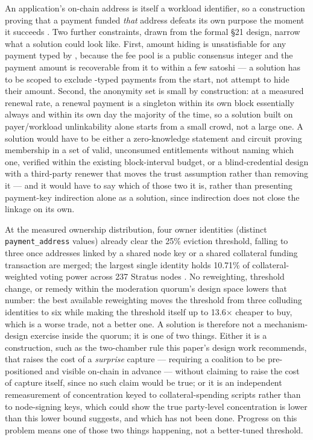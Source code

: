 \begin{openproblem}
An application's on-chain address is itself a workload identifier, so a construction proving that a
payment funded \emph{that} address defeats its own purpose the moment it succeeds
. Two further constraints, drawn from the formal §21 design,
narrow what a solution could look like. First, amount hiding is unsatisfiable for any payment typed
by \PNR, because the fee pool is a public consensus integer and the payment amount is recoverable
from it to within a few satoshi — a solution has to be scoped to exclude \PNR-typed payments from
the start, not attempt to hide their amount. Second, the anonymity set is small by construction: at a
measured renewal rate, a renewal payment is a singleton within its own block essentially always and
within its own day the majority of the time, so a solution built on payer/workload unlinkability alone
starts from a small crowd, not a large one. A solution would have to be either a zero-knowledge
statement and circuit proving membership in a set of valid, unconsumed entitlements without naming
which one, verified within the existing block-interval budget, or a blind-credential design with a
third-party renewer that moves the trust assumption rather than removing it — and it would have to say
which of those two it is, rather than presenting payment-key indirection alone as a solution, since
indirection does not close the linkage on its own.
\end{openproblem}

\begin{openproblem}
At the measured ownership distribution, four owner identities (distinct \texttt{payment\_address}
values) already clear the 25\% eviction threshold, falling to three once addresses linked by a shared
node key or a shared collateral funding transaction are merged; the largest single identity holds
10.71\% of collateral-weighted voting power across 237 Stratus nodes
. No reweighting, threshold change, or remedy within the
moderation quorum's design space lowers that number: the best available reweighting moves the
threshold from three colluding identities to six while making the threshold itself up to 13.6$\times$
cheaper to buy, which is a worse trade, not a better one. A solution is therefore not a mechanism-design
exercise inside the quorum; it is one of two things. Either it is a construction, such as the two-chamber
rule this paper's design work recommends, that raises the cost of a \emph{surprise} capture — requiring
a coalition to be pre-positioned and visible on-chain in advance — without claiming to raise the cost of
capture itself, since no such claim would be true; or it is an independent remeasurement of concentration
keyed to collateral-spending scripts rather than to node-signing keys, which could show the true
party-level concentration is lower than this lower bound suggests, and which has not been done. Progress
on this problem means one of those two things happening, not a better-tuned threshold.
\end{openproblem}

